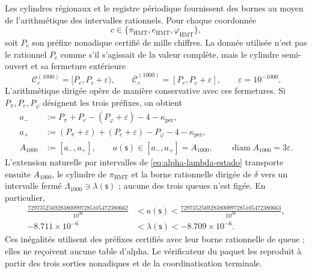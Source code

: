 Les cylindres régionaux et le registre périodique fournissent des bornes au moyen
de l'arithmétique des intervalles rationnels. Pour chaque coordonnée
\[
 c\in\{\pi_{\mathrm{HMT}},e_{\mathrm{HMT}},\varphi_{\mathrm{HMT}}\},
\]
soit \(P_c\) son préfixe nonadique certifié de mille chiffres. La donnée utilisée
n'est pas le rationnel \(P_c\) comme s'il s'agissait de la valeur complète, mais le cylindre
semi-ouvert et sa fermeture extérieure
\[
 \mathcal C_c^{(1000)}=[P_c,P_c+\varepsilon),
 \qquad
 \overline{\mathcal C}_c^{(1000)}=[P_c,P_c+\varepsilon],
 \qquad \varepsilon=10^{-1000}.
\]
L'arithmétique dirigée opère de manière conservative avec ces fermetures. Si
\(P_\pi,P_e,P_\varphi\) désignent les trois préfixes, on obtient
\begin{equation}
\begin{aligned}
 a_-&:=P_\pi+P_e-(P_\varphi+\varepsilon)-4-
       \kappa_{\mathrm{per}},\\
 a_+&:=(P_\pi+\varepsilon)+(P_e+\varepsilon)-P_\varphi-4-
       \kappa_{\mathrm{per}},\\
 A_{1000}&:=[a_-,a_+],
 \qquad a(\mathsf s)\in[a_-,a_+]=A_{1000},
 \qquad \operatorname{diam}A_{1000}=3\varepsilon.
\end{aligned}
\label{eq:alpha-propagacion-colas-rev08}
\end{equation}
L'extension naturelle par intervalles de
\eqref{eq:alpha-lambda-estado} transporte ensuite \(A_{1000}\), le cylindre
de \(\pi_{\mathrm{HMT}}\) et la borne rationnelle dirigée de \(\delta\) vers un
intervalle fermé \(\Lambda_{1000}\ni\lambda(\mathsf s)\) ; aucune
des trois queues n'est figée. En particulier,
\begin{equation}
\begin{aligned}
 \frac{7297352569283800997285105472380662}{10^{36}}
 &<a(\mathsf s)<
 \frac{7297352569283800997285105472380663}{10^{36}},\\
 -8.711\mathbin{\times}10^{-6}
 &<\lambda(\mathsf s)<-8.709\mathbin{\times}10^{-6}.
\end{aligned}
 \label{eq:alpha-cotas-precoordenada-lambda}
\end{equation}
Ces inégalités utilisent des préfixes certifiés avec leur borne rationnelle de
queue ; elles ne reçoivent aucune table d'alpha. Le vérificateur du paquet les reproduit
à partir des trois sorties nonadiques et de la coordinatisation terminale.

